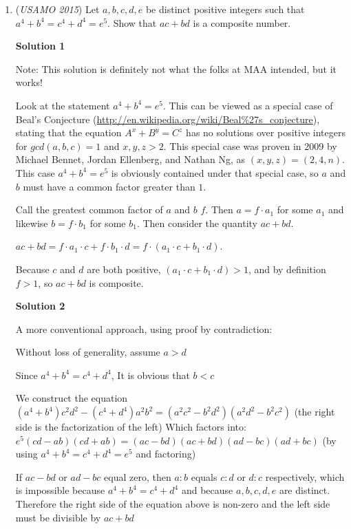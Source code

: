 \begin{enumerate}
 Solution by Shaddoll

 


	\item (\textit{USAMO 2015}) Let $a, b, c, d, e$ be distinct positive integers such that $a^4 + b^4 = c^4 + d^4 = e^5$. Show that $ac + bd$ is a composite number.


 



\textbf{Solution 1}

Note:  This solution is definitely not what the folks at MAA intended, but it works!

 Look at the statement $a^4+b^4=e^5$.  This can be viewed as a special case of Beal's Conjecture (\href{https://artofproblemsolving.comhttp://en.wikipedia.org/wiki/Beal\%27s\_conjecture}{http://en.wikipedia.org/wiki/Beal\%27s\_conjecture}), stating that the equation $A^x+B^y=C^z$ has no solutions over positive integers for $gcd(a, b, c) = 1$ and $x, y, z > 2$. This special case was proven in 2009 by Michael Bennet, Jordan Ellenberg, and Nathan Ng, as $(x, y, z) = (2, 4, n)$.  This case $a^4+b^4=e^5$ is obviously contained under that special case, so $a$ and $b$ must have a common factor greater than $1$.  

 Call the greatest common factor of $a$ and $b$ $f$.  Then $a = f \cdot a_1$ for some $a_1$ and likewise $b = f \cdot b_1$ for some $b_1$.  Then consider the quantity $ac+bd$.  

 $ac+bd = f \cdot a_1 \cdot c + f \cdot b_1 \cdot d = f\cdot(a_1 \cdot c + b_1 \cdot d)$.

 Because $c$ and $d$ are both positive, $(a_1 \cdot c + b_1 \cdot d) > 1$, and by definition $f > 1$, so $ac+bd$ is composite.  

 



\textbf{Solution 2}

A more conventional approach, using proof by contradiction:

 Without loss of generality, assume $a>d$ 

 Since $a^4 +b^4=c^4+d^4$, It is obvious that $b<c$

 We construct the equation $(a^4 +b^4)c^2d^2-(c^4+d^4)a^2b^2=(a^2c^2-b^2d^2)(a^2d^2-b^2c^2)$ (the right side is the factorization of the left) Which factors into: $e^5(cd-ab)(cd+ab)=(ac-bd)(ac+bd)(ad-bc)(ad+bc)$ (by using $a^4 +b^4=c^4+d^4=e^5$ and factoring)

 If $ac-bd$ or $ad-bc$ equal zero, then $a:b$ equals $c:d$ or $d:c$ respectively, which is impossible because $a^4 +b^4=c^4+d^4$ and because $a,b,c,d,e$ are distinct. Therefore the right side of the equation above is non-zero and the left side must be divisible by $ac+bd$ 


\end{enumerate}
